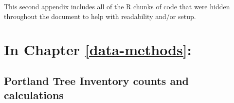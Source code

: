 \documentclass[12pt,twoside]{reedthesis}
\begin{document}
This second appendix includes all of the R chunks of code that were hidden throughout the document to help with readability and/or setup.

\hypertarget{in-chapter-refdata-methods}{%
\section{\texorpdfstring{\textbf{In Chapter} \ref{data-methods}\textbf{:}}{In Chapter \ref{data-methods}:}}\label{in-chapter-refdata-methods}}

\hypertarget{portland-tree-inventory-counts-and-calculations}{%
\subsection*{Portland Tree Inventory counts and calculations}\label{portland-tree-inventory-counts-and-calculations}}
\end{document}
